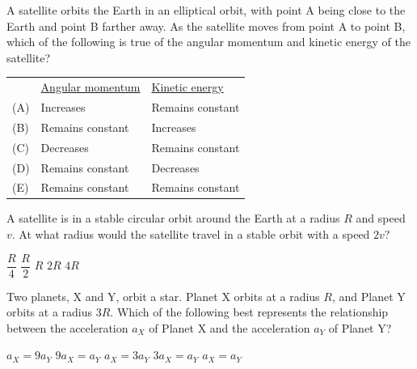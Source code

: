 \documentclass{../../../oss-apphys-exam}
\begin{document}
\begin{questions}
  \question A satellite orbits the Earth in an elliptical orbit, with point A
  being close to the Earth and point B farther away. As the satellite moves
  from point A to point B, which of the following is true of the angular
  momentum and kinetic energy of the satellite?
  \begin{center}
    \vspace{-.1in}
  \end{center}
  \begin{tabular}{lll}
    & \underline{Angular momentum} & \underline{Kinetic energy}\\
    (A) & Increases & Remains constant \\
    (B) & Remains constant & Increases \\
    (C) & Decreases & Remains constant \\
    (D) & Remains constant & Decreases \\
    (E) & Remains constant & Remains constant
  \end{tabular}
    
  \question A satellite is in a stable circular orbit around the Earth at a
  radius $R$ and speed $v$. At what radius would the satellite travel in
  a stable orbit with a speed $2v$?
  \begin{choices}
    \choice $\dfrac R4$
    \choice $\dfrac R2$
    \choice $R$
    \choice $2R$
    \choice $4R$
  \end{choices}
  \newpage
  
  \question Two planets, X and Y, orbit a star. Planet X orbits at a radius
  $R$, and Planet Y orbits at a radius $3R$. Which of the following best
  represents the relationship between the acceleration $a_X$ of Planet X and
  the acceleration $a_Y$ of Planet Y?
  \begin{center}
  \end{center}
  \begin{choices}
    \choice $a_X = 9a_Y$
    \choice $9a_X = a_Y$
    \choice $a_X = 3a_Y$
    \choice $3a_X = a_Y$
    \choice $a_X = a_Y$
  \end{choices}
    

\end{questions}
\end{document}
